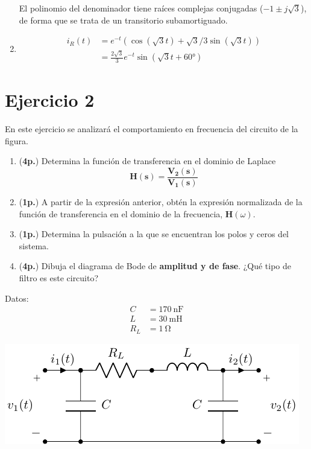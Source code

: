 \documentclass[12pt]{article}
\newcommand{\laplace}[1]{\mathbf{#1}(\mathbf{s})}
\begin{document}
\begin{enumerate}
  El polinomio del denominador tiene raíces complejas conjugadas ($-1 \pm j \sqrt{3}$), de forma que se trata de un transitorio subamortiguado.
  
\item
  
  \begin{align*}
    i_R(t) &= e^{- t} (\cos(\sqrt{3} t) + \sqrt{3}/3 \sin(\sqrt{3} t))\\
           &= \frac{2\sqrt{3}}{3} e^{- t} \sin(\sqrt{3} t + \ang{60})
  \end{align*}
    
\end{enumerate}

\clearpage

\section*{Ejercicio 2}

En este ejercicio se analizará el comportamiento en frecuencia del circuito de la figura.


\begin{enumerate}

\item (\textbf{4p.}) Determina la función de transferencia en el dominio de Laplace
  \[
    \laplace{H} = \frac{\laplace{V_2}}{\laplace{V_1}}
  \]
  
\item (\textbf{1p.}) A partir de la expresión anterior, obtén la expresión normalizada de la función de transferencia en el dominio de la frecuencia, $\mathbf{H}(\omega)$. 

\item (\textbf{1p.}) Determina la pulsación a la que se encuentran los polos y ceros del sistema.

\item (\textbf{4p.}) Dibuja el diagrama de Bode de \textbf{amplitud y de fase}. ¿Qué tipo de filtro es este circuito?

\end{enumerate}

\begin{minipage}{0.3\textwidth}
Datos:
\begin{align*}
  C &= \SI{170}{\nano\farad}\\
  L &= \SI{30}{\milli\henry}\\
  R_L &= \SI{1}{\ohm}
\end{align*}
\end{minipage}
\begin{minipage}{0.7\textwidth}
  \includegraphics{figs/circuito_respuesta_frecuencia.pdf}
\end{minipage}
\end{document}
